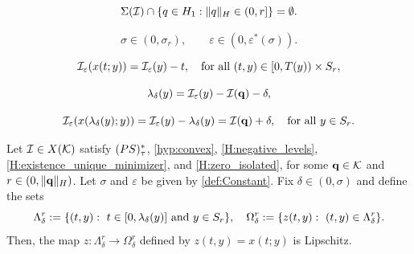 \documentclass[10pt,a4paper]{amsart}
\newcommand{\Hilb}{{\textnormal H}}
\newcommand{\PS}{(\textnormal{PS})^{*}_\tau}
\newcommand{\X}{{\textnormal X}}
\newcommand{\boI}{\mathcal{I}}
\newcommand{\boK}{\mathcal{K}}
\newcommand{\minq}{{\bf q}}
\newcommand{\taumax}{T}
\begin{document}
\begin{equation}\label{H:zero_isolated}
  \Sigma(\boI)\cap\{q\in\Hilb_1: \|q\|_\Hilb\in(0, r]\}=\emptyset.
\end{equation}

\begin{equation}\label{def:Constant}
\sigma\in(0,\sigma_r),\quad\quad\varepsilon\in(0,\varepsilon^*(\sigma)).
\end{equation}

\begin{equation}\label{ineq:regularized-flow}
\boI_\varepsilon(x(t;y))=\boI_\varepsilon(y)-t,\quad \hbox{for all } (t,y)\in[0,\taumax(y))\times S_r,
\end{equation}

\begin{equation}\label{def:lambda}
\lambda_\delta(y)=\boI_\varepsilon(y)-\boI(\minq)-\delta,
\end{equation}

\begin{equation}\label{eq:charact-lambda-flow}
\boI_\varepsilon(x(\lambda_\delta(y);y))=\boI_\varepsilon(y)-\lambda_\delta(y)=\boI(\minq)+\delta,\quad\hbox{for all }y\in S_r.
\end{equation}

\begin{corollary}\label{cor:continuity}
Let $\boI\in\X(\boK)$ satisfy $\PS$, \eqref{hyp:convex}, \eqref{H:negative_levels}, \eqref{H:existence_unique_minimizer}, and \eqref{H:zero_isolated}, for some $\minq\in\boK$ and $r\in(0,\|\minq\|_\Hilb)$. Let $\sigma$ and $\varepsilon$ be given by \eqref{def:Constant}. Fix $\delta\in(0,\sigma)$ and define the sets 
\begin{equation}\label{def:LambdaSet}
    \Lambda^r_\delta:=\{(t,y):\  t\in[0,\lambda_\delta(y)]\hbox{ and } y\in S_r\},\quad\Omega^r_\delta:=\{z(t,y):\ (t,y)\in\Lambda^r_\delta\}.
\end{equation} Then, the map $z:\Lambda^r_\delta\to\Omega^r_\delta$ defined by $z(t,y)=x(t;y)$ is Lipschitz. 
\end{corollary}
\end{document}
